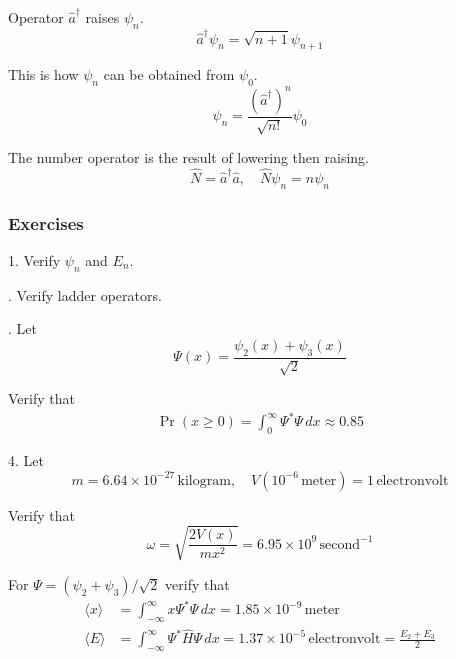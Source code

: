 Operator $\hat a^\dag$ raises $\psi_n$.
\begin{equation*}
\hat a^\dag\psi_n=\sqrt{n+1}\psi_{n+1}
\end{equation*}

This is how $\psi_n$ can be obtained from $\psi_0$.
\begin{equation*}
\psi_n=\frac{(\hat a^\dag)^n}{\sqrt{n!}}\psi_0
\end{equation*}

The number operator is the result of lowering then raising.
\begin{equation*}
\hat N=\hat a^\dag\hat a,\quad\hat N\psi_n=n\psi_n
\end{equation*}

\subsubsection*{Exercises}

1. Verify $\psi_n$ and $E_n$.

. Verify ladder operators.

. Let
\begin{equation*}
\Psi(x)=\frac{\psi_2(x)+\psi_3(x)}{\sqrt2}
\end{equation*}

Verify that
\begin{align*}
\Pr(x\ge0)=\int_0^\infty \Psi^*\Psi\,dx\approx0.85
\end{align*}

4. Let
\begin{equation*}
m=6.64\times10^{-27}\,\text{kilogram},\quad
V(10^{-6}\,\text{meter})=1\,\text{electronvolt}
\end{equation*}

Verify that
\begin{equation*}
\omega=\sqrt{\frac{2V(x)}{mx^2}}=6.95\times10^9\,\text{second}^{-1}
\end{equation*}

For $\Psi=(\psi_2+\psi_3)/\sqrt2$ verify that
\begin{align*}
\langle x\rangle&=\int_{-\infty}^\infty x\Psi^*\Psi\,dx=1.85\times10^{-9}\,\text{meter}
\\
\langle E\rangle&=\int_{-\infty}^\infty \Psi^*\hat H\Psi\,dx=1.37\times10^{-5}\,\text{electronvolt}
=\frac{E_2+E_3}{2}
\end{align*}


